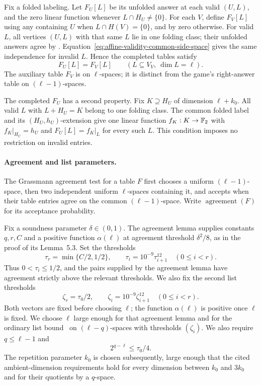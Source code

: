 Fix a folded labeling.  Let $F_U[L]$ be its unfolded answer at each
valid $(U,L)$, and the zero linear function whenever
$L\cap H_U\ne\{0\}$.  For each $V$, define $F_V[L]$ using any
containing $U$ when $L\cap H(V)=\{0\}$, and by zero otherwise.
For valid $L$, all vertices $(U,L)$ with that same $L$ lie in one
folding class; their unfolded answers agree by
\cite[Claim~4.4]{DKKMS25}.  Equation~\eqref{eq:affine-validity-common-side-space}
gives the same independence for invalid $L$.  Hence the completed tables
satisfy
\begin{equation}
  F_U[L]=F_V[L]\qquad(L\subseteq V_V,\ \dim L=\ell).
  \label{eq:affine-validity-completed-consistency}
\end{equation}
The auxiliary table $F_V$ is on $\ell$-spaces; it is distinct from
the game's right-answer table on $(\ell-1)$-spaces.

The completed $F_U$ has a second property.  Fix
$K\supseteq H_U$ of dimension $\ell+k_0$.  All valid $L$ with
$L+H_U=K$ belong to one folding class.  The common folded label and
its $(H_U,h_U)$-extension give one linear function $f_K:K\to\mathbb F_2$
with $f_K|_{H_U}=h_U$ and $F_U[L]=f_K|_L$ for every such $L$.
This condition imposes no restriction on invalid entries.

\paragraph{Agreement and list parameters.}
The Grassmann agreement test for a table $F$ first chooses a uniform
$(\ell-1)$-space, then two independent uniform $\ell$-spaces containing
it, and accepts when their table entries agree on the common
$(\ell-1)$-space.  Write $\operatorname{agreement}(F)$ for its
acceptance probability.

Fix a soundness parameter $\delta\in(0,1)$.  The agreement lemma
\cite[Lemma~3.7]{DKKMS25} supplies constants
$q,r,C$ and a positive function $\alpha(\ell)$ at agreement threshold
$\delta^2/8$, as in the proof of its Lemma~5.3.  Set the thresholds
\[
  \tau_r=\min\{C/2,1/2\},\qquad
  \tau_i=10^{-9}\tau_{i+1}^{12}\quad(0\le i<r).
\]
Thus $0<\tau_i\le1/2$, and the pairs supplied by the agreement lemma
have agreement strictly above the relevant thresholds.
We also fix the second list thresholds
\[
 \zeta_r=\tau_0/2,\qquad
 \zeta_i=10^{-9}\zeta_{i+1}^{12}\quad(0\le i<r).
\]
Both vectors are fixed before choosing $\ell$;
the function $\alpha(\ell)$ is positive once $\ell$ is fixed.
We choose $\ell$ large enough for that agreement lemma and for the
ordinary list bound~\cite[Lemma~3.12]{DKKMS25} on
$(\ell-q)$-spaces with thresholds $(\zeta_i)$.  We also require
$q\le\ell-1$ and
\begin{equation}
  2^{q-\ell}\le\tau_0/4.
  \label{eq:affine-validity-ell-margin}
\end{equation}
The repetition parameter $k_0$ is chosen subsequently, large enough that
the cited ambient-dimension requirements hold for every dimension
between $k_0$ and $3k_0$ and for their quotients by a $q$-space.


